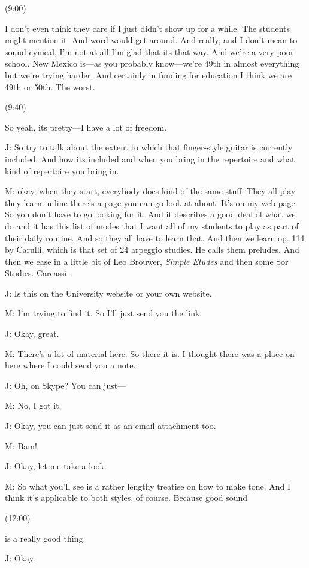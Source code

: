 \documentclass[11pt]{article}
\begin{document}
(9:00)

I don't even think they care if I just didn't show up for a while. The students might mention it. And word would get around. And really, and I don't mean to sound cynical, I'm not at all I'm glad that its that way. And we're a very poor school. New Mexico is---as you probably know---we're 49th in almost everything but we're trying harder. And certainly in funding for education I think we are 49th or 50th. The worst.

(9:40)

So yeah, its pretty---I have a lot of freedom.

J: So try to talk about the extent to which that finger-style guitar is currently included. And how its included and when you bring in the repertoire and what kind of repertoire you bring in. 

M: okay, when they start, everybody does kind of the same stuff. They all play they learn in line there's a page you can go look at about. It's on my web page. So you don't have to go looking for it. And it describes a good deal of what we do and it has this list of modes that I want all of my students to play as part of their daily routine. And so they all have to learn that. And then we learn op. 114 by Carulli, which is that set of 24 arpeggio studies. He calls them preludes. And then we ease in a little bit of Leo Brouwer, \emph{Simple Etudes} and then some Sor Studies. Carcassi.

J: Is this on the University website or your own website.

M: I'm trying to find it. So I'll just send you the link.

J: Okay, great.

M: There's a lot of material here. So there it is. I thought there was a place on here where I could send you a note. 

J: Oh, on Skype? You can just---

M: No, I got it.

J: Okay, you can just send it as an email attachment too. 

M: Bam!

J: Okay, let me take a look.

M: So what you'll see is a rather lengthy treatise on how to make tone. And I think it's applicable to both styles, of course. Because good sound 

(12:00)

is a really good thing.

J: Okay.
\end{document}
